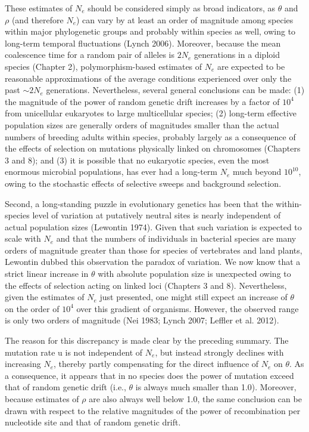 \documentclass{article}
\begin{document}
These estimates of  $ N_e $ should be considered simply as broad indicators, as  $ \theta $ and  $ \rho $ (and therefore  $ N_e $) can vary by at least an order of magnitude among species within major phylogenetic groups and probably within species as well, owing to long-term temporal fluctuations (Lynch 2006). Moreover, because the mean coalescence time for a random pair of alleles is  $ 2N_e $ generations in a diploid species (Chapter 2), polymorphism-based estimates of  $ N_e $ are expected to be reasonable approximations of the average conditions experienced over only the past  $ \sim2N_e $ generations. Nevertheless, several general conclusions can be made: (1) the magnitude of the power of random genetic drift increases by a factor of  $ 10^4 $ from unicellular eukaryotes to large multicellular species; (2) long-term effective population sizes are generally orders of magnitudes smaller than the actual numbers of breeding adults within species, probably largely as a consequence of the effects of selection on mutations physically linked on chromosomes (Chapters 3 and 8); and (3) it is possible that no eukaryotic species, even the most enormous microbial populations, has ever had a long-term  $ N_e $ much beyond  $ 10^{10} $, owing to the stochastic effects of selective sweeps and background selection.

Second, a long-standing puzzle in evolutionary genetics has been that the within-species level of variation at putatively neutral sites is nearly independent of actual population sizes (Lewontin 1974). Given that such variation is expected to scale with  $ N_e $ and that the numbers of individuals in bacterial species are many orders of magnitude greater than those for species of vertebrates and land plants, Lewontin dubbed this observation the paradox of variation. We now know that a strict linear increase in  $ \theta $ with absolute population size is unexpected owing to the effects of selection acting on linked loci (Chapters 3 and 8). Nevertheless, given the estimates of  $ N_e $ just presented, one might still expect an increase of  $ \theta $ on the order of  $ 10^4 $ over this gradient of organisms. However, the observed range is only two orders of magnitude (Nei 1983; Lynch 2007; Leffler et al. 2012).

The reason for this discrepancy is made clear by the preceding summary. The mutation rate u is not independent of  $ N_{e} $, but instead strongly declines with increasing  $ N_{e} $, thereby partly compensating for the direct influence of  $ N_{e} $ on  $ \theta $. As a consequence, it appears that in no species does the power of mutation exceed that of random genetic drift (i.e.,  $ \theta $ is always much smaller than 1.0). Moreover, because estimates of  $ \rho $ are also always well below 1.0, the same conclusion can be drawn with respect to the relative magnitudes of the power of recombination per nucleotide site and that of random genetic drift.
\end{document}
